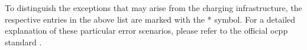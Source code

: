 \noindent To distinguish the exceptions that may arise from the charging infrastructure, the respective entries in the above list are marked with the * symbol. For a detailed explanation of these particular error scenarios, please refer to the official \acrshort{ocpp} standard \cite{noauthor_ocpp_nodate}.
